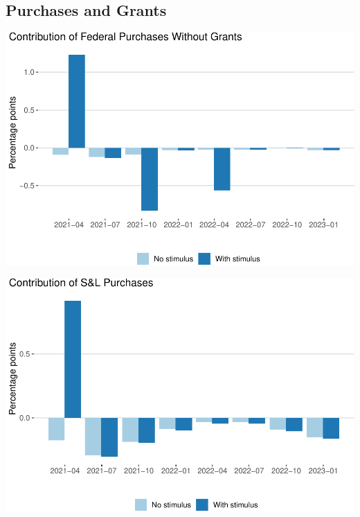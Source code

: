\documentclass[
]{article}
\begin{document}
\hypertarget{purchases-and-grants}{%
\subsection{Purchases and Grants}\label{purchases-and-grants}}

\begin{center}\includegraphics{stimulus-changes_files/figure-latex/purchases-federal-1} \end{center}

\begin{center}\includegraphics{stimulus-changes_files/figure-latex/purchases-state-1} \end{center}
\end{document}
